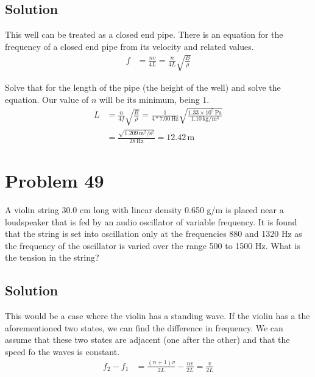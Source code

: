 \documentclass[12pt]{article}
\newcommand{\E}[1]{\times 10^{#1}}
\begin{document}
        \subsection{Solution}
            This well can be treated as a closed end pipe.
            There is an equation for the frequency of a closed end pipe from its velocity and related values.
            \begin{align}
                f   &=  \frac{nv}{4L}
                    =   \frac{n}{4L} \sqrt{\frac{B}{\rho}}
            \end{align}

            Solve that for the length of the pipe (the height of the well) and solve the equation.
            Our value of $n$ will be its minimum, being $1$.
            \begin{align}
                L   &=  \frac{n}{4f} \sqrt{\frac{B}{\rho}}
                    =   \frac{1}{4*7.00\,\unit{\hertz}} \sqrt{\frac{1.33\E{5}\,\unit{\pascal}}{1.10\,\unit{\kilo\gram/\meter^3}}}\\
                    &=  \frac{\sqrt{1.209\,\unit{\meter^2/\second^2}}}{28\,\unit{\hertz}}
                    =   \boxed{12.42\,\unit{\meter}}
            \end{align}

    \pagebreak
    \section{Problem 49}
        A violin string 30.0 cm long with linear density 0.650 g/m is placed near a loudspeaker that is fed by an audio oscillator of variable frequency. 
        It is found that the string is set into oscillation only at the frequencies 880 and 1320 Hz as the frequency of the oscillator is varied over the range 500 to 1500 Hz.
        What is the tension in the string?

        \subsection{Solution}
            This would be a case where the violin has a standing wave.
            If the violin has a the aforementioned two states, we can find the difference in frequency.
            We can assume that these two states are adjacent (one after the other) and that the speed fo the waves is constant.
            \begin{align}
                f_2 - f_1   &=  \frac{(n+1)v}{2L} - \frac{nv}{2L}
                    =   \frac{v}{2L}
            \end{align}
\end{document}
